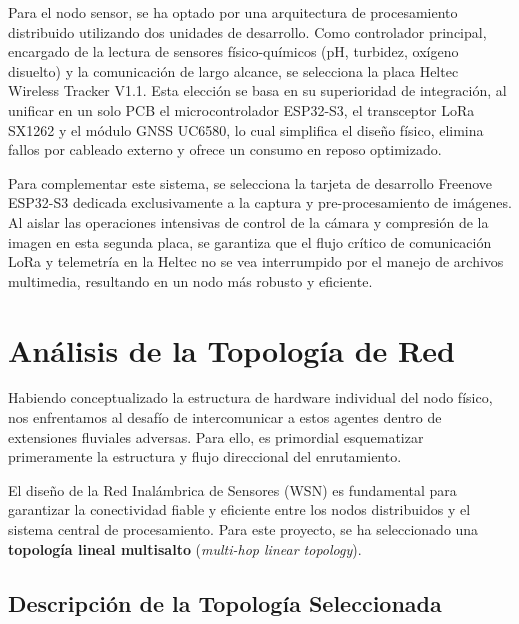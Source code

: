 Para el nodo sensor, se ha optado por una arquitectura de procesamiento distribuido utilizando dos unidades de desarrollo. Como controlador principal, encargado de la lectura de sensores físico-químicos (pH, turbidez, oxígeno disuelto) y la comunicación de largo alcance, se selecciona la placa Heltec Wireless Tracker V1.1. Esta elección se basa en su superioridad de integración, al unificar en un solo PCB el microcontrolador ESP32-S3, el transceptor LoRa SX1262 y el módulo GNSS UC6580, lo cual simplifica el diseño físico, elimina fallos por cableado externo y ofrece un consumo en reposo optimizado.

Para complementar este sistema, se selecciona la tarjeta de desarrollo Freenove ESP32-S3 dedicada exclusivamente a la captura y pre-procesamiento de imágenes. Al aislar las operaciones intensivas de control de la cámara y compresión de la imagen en esta segunda placa, se garantiza que el flujo crítico de comunicación LoRa y telemetría en la Heltec no se vea interrumpido por el manejo de archivos multimedia, resultando en un nodo más robusto y eficiente.

\section{Análisis de la Topología de Red}
\label{sec:analisis_de_la_topologia_de_red}
Habiendo conceptualizado la estructura de hardware individual del nodo físico, nos enfrentamos al desafío de intercomunicar a estos agentes dentro de extensiones fluviales adversas. Para ello, es primordial esquematizar primeramente la estructura y flujo direccional del enrutamiento.

El diseño de la Red Inalámbrica de Sensores (WSN) es fundamental para garantizar la conectividad fiable y eficiente entre los nodos distribuidos y el sistema central de procesamiento. Para este proyecto, se ha seleccionado una \textbf{topología lineal multisalto} (\textit{multi-hop linear topology}).

\subsection{Descripción de la Topología Seleccionada}
\label{subsec:descripcion_topologia}

